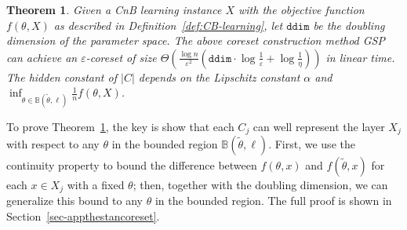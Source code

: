 \documentclass{article}
\newtheorem{theorem}{Theorem}
\newtheorem{remark}[lemma]{Remark}
\begin{document}

\begin{theorem}\label{thm:standard-coreset}
 Given a CnB learning instance $X$ with the objective function $ f(\theta,X) $  as described in Definition~\ref{def:CB-learning},  let $\mathtt{ddim}$ be the doubling dimension of the parameter space.  The above coreset construction method GSP can achieve an $ \varepsilon $-coreset of size $ \Theta\left(\frac{\log n}{\varepsilon^2}\left(\mathtt{ddim}\cdot\log\frac{1}{\varepsilon}+\log\frac{1}{\eta}\right)\right) $ in linear time. The hidden constant of $|C|$ depends on the Lipschitz constant $\alpha$ and $\inf_{\theta\in\mathbb{B}(\tilde{\theta}, \ell)} \frac{1}{n}f(\theta,X)$.  
 \end{theorem}
 To prove Theorem~\ref{thm:standard-coreset}, the key is  show that each $C_j$ can well represent the layer $X_j$ with respect to any $\theta$ in the bounded region $\mathbb{B}(\tilde{\theta}, \ell)$. First, we use the continuity property to bound the difference between $f(\theta, x)$ and $f(\tilde{\theta}, x)$ for each $x\in X_j$ with a fixed $\theta$; then, together with the doubling dimension, we can generalize this bound to any $\theta$ in the bounded region. 
 The full proof is shown in Section~\ref{sec-appthestancoreset}. 
 
\end{document}
